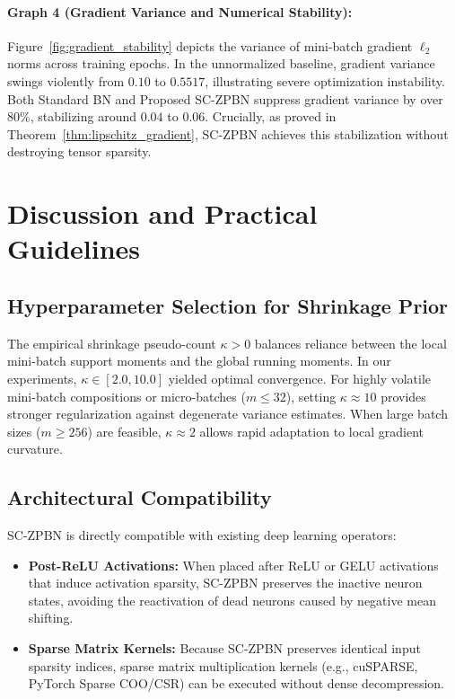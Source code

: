 \documentclass[twocolumn,10pt]{article}
\begin{document}
\paragraph{Graph 4 (Gradient Variance and Numerical Stability):}
Figure~\ref{fig:gradient_stability} depicts the variance of mini-batch gradient $\ell_2$ norms across training epochs. In the unnormalized baseline, gradient variance swings violently from $0.10$ to $0.5517$, illustrating severe optimization instability. Both Standard BN and Proposed SC-ZPBN suppress gradient variance by over $80\%$, stabilizing around $0.04$ to $0.06$. Crucially, as proved in Theorem~\ref{thm:lipschitz_gradient}, SC-ZPBN achieves this stabilization without destroying tensor sparsity.

\section{Discussion and Practical Guidelines}
\label{sec:discussion}

\subsection{Hyperparameter Selection for Shrinkage Prior}
The empirical shrinkage pseudo-count $\kappa > 0$ balances reliance between the local mini-batch support moments and the global running moments. In our experiments, $\kappa \in [2.0, 10.0]$ yielded optimal convergence. For highly volatile mini-batch compositions or micro-batches ($m \le 32$), setting $\kappa \approx 10$ provides stronger regularization against degenerate variance estimates. When large batch sizes ($m \ge 256$) are feasible, $\kappa \approx 2$ allows rapid adaptation to local gradient curvature.

\subsection{Architectural Compatibility}
SC-ZPBN is directly compatible with existing deep learning operators:
\begin{itemize}
    \item \textbf{Post-ReLU Activations:} When placed after ReLU or GELU activations that induce activation sparsity, SC-ZPBN preserves the inactive neuron states, avoiding the reactivation of dead neurons caused by negative mean shifting.
    \item \textbf{Sparse Matrix Kernels:} Because SC-ZPBN preserves identical input sparsity indices, sparse matrix multiplication kernels (e.g., cuSPARSE, PyTorch Sparse COO/CSR) can be executed without dense decompression.
\end{itemize}
\end{document}
